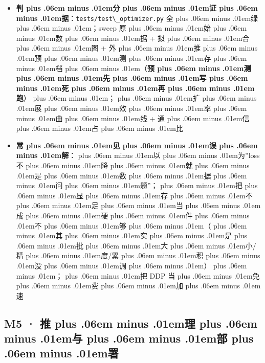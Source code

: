 \documentclass[
]{article}
\newcommand{\passthrough}[1]{#1}
\def\zh#1{{\zhfont #1}}
\def\sym#1{{\symfont #1}}
\def\zhglue{\hskip0pt plus .06em minus .01em}
\begin{document}
\begin{itemize}
\item
  \textbf{\zh{判\zhglue 分\zhglue 证\zhglue 据}}\zh{：}\passthrough{\lstinline!tests/test\_optimizer.py!} \zh{全\zhglue 绿\zhglue ；}sweep \zh{原\zhglue 始\zhglue 数\zhglue 据} + \zh{拟\zhglue 合\zhglue 图} + \zh{外\zhglue 推\zhglue 预\zhglue 测\zhglue 存\zhglue 档\zhglue （}\textbf{\zh{预\zhglue 测\zhglue 先\zhglue 写\zhglue 死\zhglue 再\zhglue 跑}}\zh{）\zhglue ；\zhglue 扩\zhglue 展\zhglue 效\zhglue 率\zhglue 曲\zhglue 线} + \zh{通\zhglue 信\zhglue 占\zhglue 比}
\item
  \textbf{\zh{常\zhglue 见\zhglue 误\zhglue 解}}\zh{：\zhglue 以\zhglue 为}''loss \zh{不\zhglue 降\zhglue 就\zhglue 是\zhglue 数\zhglue 据\zhglue 问\zhglue 题}''\zh{；\zhglue 把\zhglue 显\zhglue 存\zhglue 不\zhglue 足\zhglue 当\zhglue 成\zhglue 硬\zhglue 件\zhglue 不\zhglue 够\zhglue （\zhglue 其\zhglue 实\zhglue 是\zhglue 批\zhglue 大\zhglue 小}/\zh{精\zhglue 度}/\zh{累\zhglue 积\zhglue 没\zhglue 调\zhglue ）\zhglue ；\zhglue 把} DDP \zh{当\zhglue 免\zhglue 费\zhglue 加\zhglue 速}
\end{itemize}

\subsection{M5 \sym{·} \zh{推\zhglue 理\zhglue 与\zhglue 部\zhglue 署}}\label{m5-ux63a8ux7406ux4e0eux90e8ux7f72}
\end{document}
